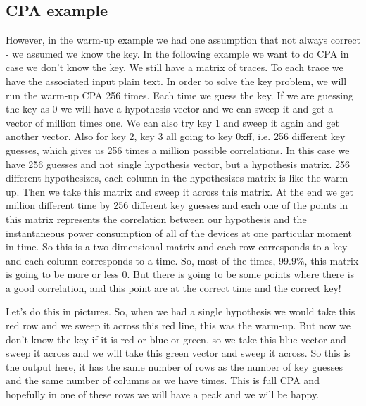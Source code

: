 \subsection{CPA example}\label{c8_CPA_example:subsec}

However, in the warm-up example we had one assumption that not always correct - we assumed we know the key. In the following example we want to do CPA in case we don't know the key. We still have a matrix of traces. To each trace we have the associated input plain text. In order to solve the key problem, we will run the warm-up CPA 256 times. Each time we guess the key. If we are guessing the key as 0 we will have a hypothesis vector and we can sweep it and get a vector of million times one. We can also try key 1 and sweep it again and get another vector. Also for key 2, key 3 all going to key 0xff, i.e. 256 different key guesses, which gives us 256 times a million possible correlations. In this case we have 256 guesses and not single hypothesis vector, but a hypothesis matrix. 256 different hypothesizes, each column in the hypothesizes matrix is like the warm-up. Then we take this matrix and sweep it across this matrix. At the end we get million different time by 256 different key guesses and each one of the points in this matrix represents the correlation between our hypothesis and the instantaneous power consumption of all of the devices at one particular moment in time. So this is a two dimensional matrix and each row corresponds to a key and each column corresponds to a time. So, most of the times, 99.9\%, this matrix is going to be more or less 0. But there is going to be some points where there is a good correlation, and this point are at the correct time and the correct key!

Let's do this in pictures. So, when we had a single hypothesis we would take this red row and we sweep it across this red line, this was the warm-up. But now we don't know the key if it is red or blue or green, so we take this blue vector and sweep it across and we will take this green vector and sweep it across. So this is the output here, it has the same number of rows as the number of key guesses and the same number of columns as we have times. This is full CPA and hopefully in one of these rows we will have a peak and we will be happy. 

